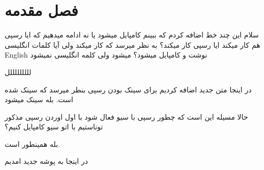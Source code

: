 ﻿\chapter{فصل مقدمه} 
\newpage
سلام این چند خط اضافه کردم که ببینم کامپایل میشود یا نه
ادامه میدهیم که ایا رسپی هم کار میکند
ایا رسپی کار میکند؟
به نظر میرسد که کار میکند ولی آیا کلمات انگلیسی English نوشت و کامپایل میشود؟
میشود ولی کلمه انگلیسی نمیشود

لللللللللل

در اینجا متن جدید اضافه کردیم برای سینک بودن رسپی
بنطر میرسد که سینک شده است.
بله سینک میشود

حالا مسیله این است که چطور رسپی با سیو فعال شود
با اول اوردن رسپی مذکور توناستیم با اتو سیو کامپایل کنیم؟


بله همینطور است.

در اینجا به پوشه جدید امدیم
